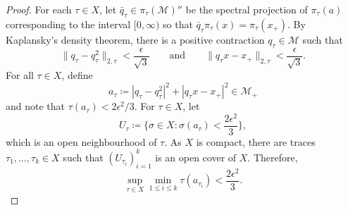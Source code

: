 \documentclass[a4paper,11pt]{amsart}
\theoremstyle{definition}
\numberwithin{equation}{section}
\numberwithin{theorem}{section}
\newcommand{\M}{\mathcal{M}}
\begin{document}
\begin{proof}
	For each $\tau \in X$, let $\bar q_\tau \in \pi_\tau(\M)''$ be the spectral projection of $\pi_\tau(a)$ corresponding to the interval $[0, \infty)$ so that $\bar q_\tau \pi_\tau(x) = \pi_\tau(x_+)$.  By Kaplansky's density theorem, there is a positive contraction $q_\tau \in \M$ such that
	\begin{equation}
		\|q_\tau - q_\tau^2\|_{2, \tau} < \frac{\epsilon}{\sqrt3} \qquad \text{and} \qquad \| q_\tau x - x_+ \|_{2, \tau} < \frac{\epsilon}{\sqrt3}.
	\end{equation}
	For all $\tau \in X$, define 
	\begin{equation}
		a_\tau \coloneqq |q_\tau - q_\tau^2|^2 +  |q_\tau x - x_+|^2 \in \M_+
	\end{equation} 
	and note that $\tau(a_\tau) < 2\epsilon^2/3$.  For $\tau \in X$, let
	\begin{equation}
		U_\tau \coloneqq \Big\{\sigma \in X : \sigma(a_\tau) < \frac{2\epsilon^2}{3}\Big\},
	\end{equation}
	which is an open neighbourhood of $\tau$.  As $X$ is compact, there are traces $\tau_1, \ldots, \tau_k \in X$ such that $(U_{\tau_i})_{i=1}^k$ is an open cover of $X$.  Therefore,
	\begin{equation}
		\sup_{\tau \in X} \min_{1 \leq i \leq k} \tau(a_{\tau_i}) < \frac{2\epsilon^2}{3}.
	\end{equation}
	

\end{proof}
\end{document}
